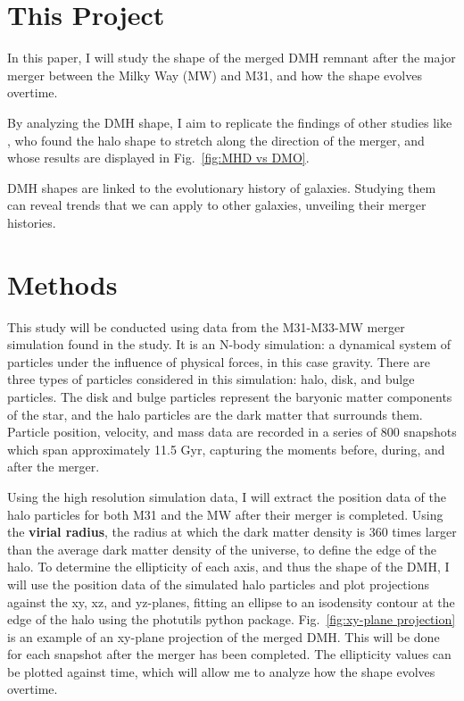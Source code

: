 \documentclass[fleqn,usenatbib]{mnras}
\begin{document}
\section{This Project}

In this paper, I will study the shape of the merged DMH remnant after the major merger between the Milky Way (MW) and M31, and how the shape evolves overtime.  

By analyzing the DMH shape, I aim to replicate the findings of other studies like \citet{Drakos_2019}, who found the halo shape to stretch along the direction of the merger, and \citet{Prada_2019} whose results are displayed in Fig.~\ref{fig:MHD vs DMO}.

DMH shapes are linked to the evolutionary history of galaxies. Studying them can reveal trends that we can apply to other galaxies, unveiling their merger histories.



\section{Methods}

This study will be conducted using data from the M31-M33-MW merger simulation found in the \citet{van_der_Marel_2012} study. It is an N-body simulation: a dynamical system of particles under the influence of physical forces, in this case gravity. There are three types of particles considered in this simulation: halo, disk, and bulge particles. The disk and bulge particles represent the baryonic matter components of the star, and the halo particles are the dark matter that surrounds them. Particle position, velocity, and mass data are recorded in a series of 800 snapshots which span approximately 11.5 Gyr, capturing the moments before, during, and after the merger.

Using the high resolution simulation data, I will extract the position data of the halo particles for both M31 and the MW after their merger is completed. Using the \textbf{virial radius}, the radius at which the dark matter density is 360 times larger than the average dark matter density of the universe, to define the edge of the halo. To determine the ellipticity of each axis, and thus the shape of the DMH, I will use the position data of the simulated halo particles and plot projections against the xy, xz, and yz-planes, fitting an ellipse to an isodensity contour at the edge of the halo using the photutils python package. Fig.~\ref{fig:xy-plane projection} is an example of an xy-plane projection of the merged DMH. This will be done for each snapshot after the merger has been completed. The ellipticity values can be plotted against time, which will allow me to analyze how the shape evolves overtime.
\end{document}
